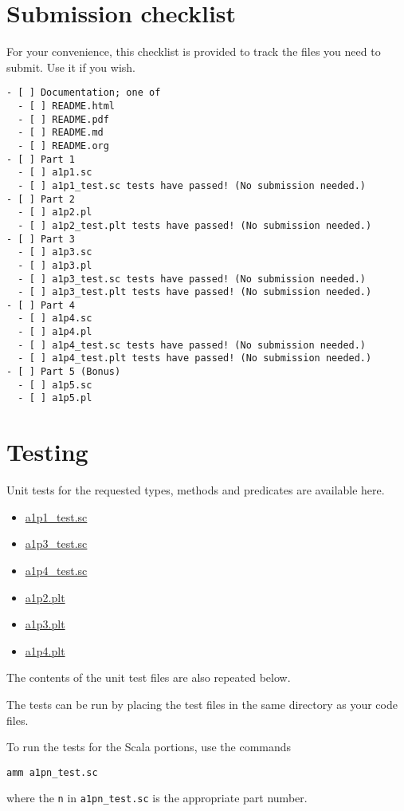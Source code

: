 \documentclass[11pt]{article}
\begin{document}
\section*{Submission checklist}
\label{sec:org3742989}
For your convenience, this checklist is provided
to track the files you need to submit.
Use it if you wish.
\begin{verbatim}
- [ ] Documentation; one of
  - [ ] README.html
  - [ ] README.pdf
  - [ ] README.md
  - [ ] README.org
- [ ] Part 1
  - [ ] a1p1.sc
  - [ ] a1p1_test.sc tests have passed! (No submission needed.)
- [ ] Part 2
  - [ ] a1p2.pl
  - [ ] a1p2_test.plt tests have passed! (No submission needed.)
- [ ] Part 3
  - [ ] a1p3.sc
  - [ ] a1p3.pl
  - [ ] a1p3_test.sc tests have passed! (No submission needed.)
  - [ ] a1p3_test.plt tests have passed! (No submission needed.)
- [ ] Part 4
  - [ ] a1p4.sc
  - [ ] a1p4.pl
  - [ ] a1p4_test.sc tests have passed! (No submission needed.)
  - [ ] a1p4_test.plt tests have passed! (No submission needed.)
- [ ] Part 5 (Bonus)
  - [ ] a1p5.sc
  - [ ] a1p5.pl
\end{verbatim}

\section*{Testing}
\label{sec:org1b79451}
Unit tests for the requested types, methods and predicates
are available here.
\begin{itemize}
\item \href{./testing/a1/a1p1\_test.sc}{a1p1\_test.sc}
\item \href{./testing/a1/a1p3\_test.sc}{a1p3\_test.sc}
\item \href{./testing/a1/a1p4\_test.sc}{a1p4\_test.sc}
\item \href{./testing/a1/a1p2.plt}{a1p2.plt}
\item \href{./testing/a1/a1p3.plt}{a1p3.plt}
\item \href{./testing/a1/a1p4.plt}{a1p4.plt}
\end{itemize}
The contents of the unit test files are also repeated below.

The tests can be run by placing the test files
in the same directory as your code files.

To run the tests for the Scala portions, use the commands
\begin{verbatim}
amm a1pn_test.sc
\end{verbatim}
where the \texttt{n} in \texttt{a1pn\_test.sc} is the appropriate part number.
\end{document}
